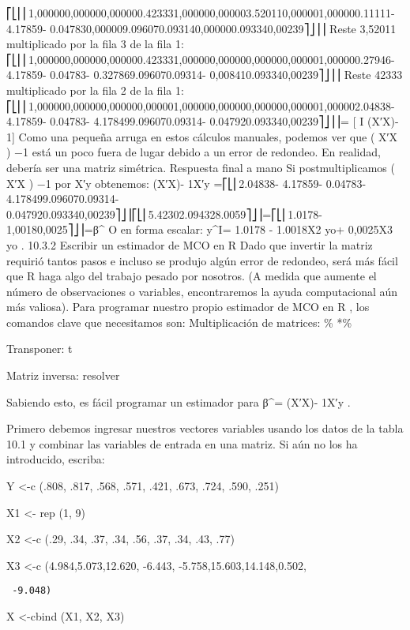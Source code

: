 \documentclass[
]{book}
\begin{document}
⎡⎣⎢⎢1,000000,000000,000000.423331,000000,000003.520110,000001,000000.11111- 4.17859- 0.047830,000009.096070.093140,000000.093340,00239⎤⎦⎥⎥
Reste 3,52011 multiplicado por la fila 3 de la fila 1:
⎡⎣⎢⎢1,000000,000000,000000.423331,000000,000000,000000,000001,000000.27946- 4.17859- 0.04783- 0.327869.096070.09314- 0,008410.093340,00239⎤⎦⎥⎥
Reste 42333 multiplicado por la fila 2 de la fila 1:
⎡⎣⎢⎢1,000000,000000,000000,000001,000000,000000,000000,000001,000002.04838- 4.17859- 0.04783- 4.178499.096070.09314- 0.047920.093340,00239⎤⎦⎥⎥= {[} I \textbar{} (X′X)- 1{]}
Como una pequeña arruga en estos cálculos manuales, podemos ver que ( X′X ) −1 está un poco fuera de lugar debido a un error de redondeo. En realidad, debería ser una matriz simétrica.
Respuesta final a mano
Si postmultiplicamos ( X′X ) −1 por X′y obtenemos:
(X′X)- 1X′y =⎡⎣⎢2.04838- 4.17859- 0.04783- 4.178499.096070.09314- 0.047920.093340,00239⎤⎦⎥⎡⎣⎢5.42302.094328.0059⎤⎦⎥=⎡⎣⎢1.0178- 1,00180,0025⎤⎦⎥=β\^{}
O en forma escalar: y\^{}I= 1.0178 - 1.0018X2 yo+ 0,0025X3 yo .
10.3.2 Escribir un estimador de MCO en R
Dado que invertir la matriz requirió tantos pasos e incluso se produjo algún error de redondeo, será más fácil que R haga algo del trabajo pesado por nosotros. (A medida que aumente el número de observaciones o variables, encontraremos la ayuda computacional aún más valiosa). Para programar nuestro propio estimador de MCO en R , los comandos clave que necesitamos son:
Multiplicación de matrices: \% *\%

Transponer: t

Matriz inversa: resolver

Sabiendo esto, es fácil programar un estimador para β\^{}= (X′X)- 1X′y .

Primero debemos ingresar nuestros vectores variables usando los datos de la tabla 10.1 y combinar las variables de entrada en una matriz. Si aún no los ha introducido, escriba:

Y \textless-c (.808, .817, .568, .571, .421, .673, .724, .590, .251)

X1 \textless- rep (1, 9)

X2 \textless-c (.29, .34, .37, .34, .56, .37, .34, .43, .77)

X3 \textless-c (4.984,5.073,12.620, -6.443, -5.758,15.603,14.148,0.502,

\begin{verbatim}
 -9.048)
\end{verbatim}

X \textless-cbind (X1, X2, X3)
\end{document}
